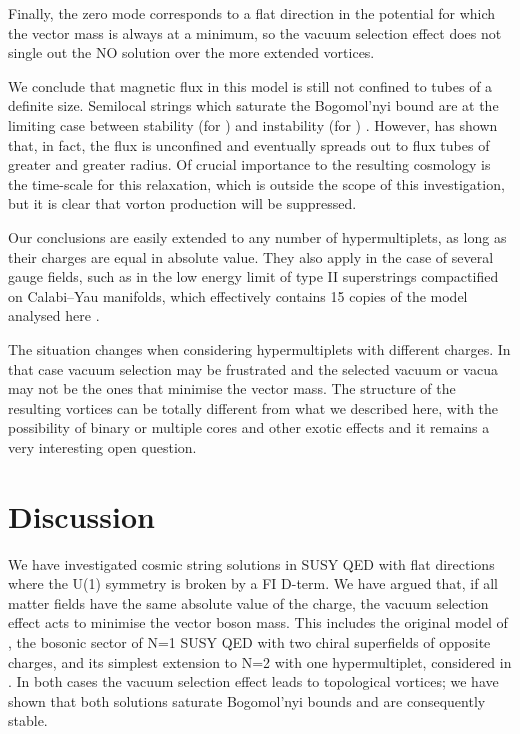 \documentclass[a4paper,aps,prd,superscriptaddress,floats]{revtex4}
\begin{document}
Finally, the zero mode corresponds to a flat direction 
in the potential for which the vector mass is 
always at a minimum, so the vacuum selection effect 
does not single out the NO solution over the more extended vortices.

We conclude that magnetic flux in this model is still not confined to
tubes of a definite size. Semilocal strings which saturate the
Bogomol'nyi bound are at the limiting case between stability (for \coordHE{}) and instability (for \coordHE{}) \cite{H92,AV00}.  However,
\cite{leese} has shown that, in fact, the flux is unconfined and
eventually spreads out to flux tubes of greater and greater radius. Of
crucial importance to the resulting cosmology is the time-scale for
this relaxation, which is outside the scope of this investigation, but
it is clear that vorton production will be suppressed.

Our conclusions are easily extended to any number of hypermultiplets,
as long as their charges are equal in absolute value. They also apply
in the case of several gauge fields, such as in the low energy
limit of type II superstrings compactified on Calabi--Yau manifolds,
which effectively contains 15 copies of the model analysed here
\cite{GMV96}.

The situation changes when considering hypermultiplets with different
charges. In that case vacuum selection may be frustrated and the
selected vacuum or vacua may not be the ones that minimise the vector
mass. The structure of the resulting vortices can be totally different
from what we described here, with the possibility of binary or
multiple cores and other exotic effects and it remains a very
interesting open question.

\section{Discussion}

We have investigated cosmic string solutions in SUSY QED
 with flat directions where the U(1) symmetry is broken by a
FI D-term.  We have argued that, if all
matter fields have the same absolute value of the charge, the vacuum
selection effect acts to minimise the vector
boson mass.  This includes the original model of
\cite{PRTT96}, the bosonic sector of N=1 SUSY QED with two
chiral superfields of opposite charges, and its simplest extension to
N=2 with one hypermultiplet, considered in \cite{hou}. In both cases
the vacuum selection effect leads to topological vortices; we have
shown that both solutions saturate Bogomol'nyi bounds and are
consequently stable.
\end{document}
